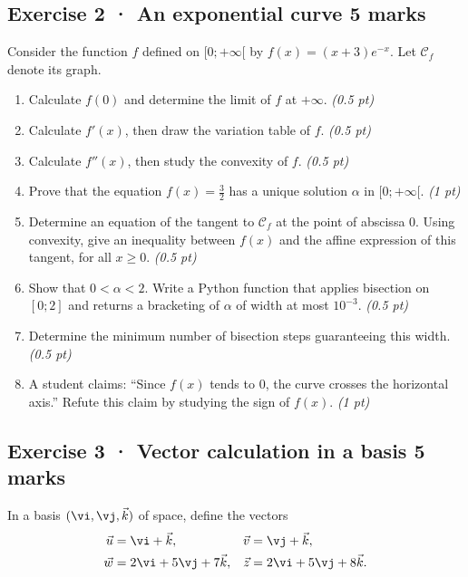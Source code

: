 \subsection*{Exercise 2 · An exponential curve \hfill 5 marks}Consider the function $f$ defined on $[0;+\infty[$ by $f(x)=(x+3)e^{-x}$. Let $\mathcal C_f$ denote its graph.

\begin{enumerate}

\item Calculate $f(0)$ and determine the limit of $f$ at $+\infty$. \hfill\textit{(0.5 pt)}

\item Calculate $f'(x)$, then draw the variation table of $f$. \hfill\textit{(0.5 pt)}

\item Calculate $f''(x)$, then study the convexity of $f$. \hfill\textit{(0.5 pt)}

\item Prove that the equation $f(x)=\frac{3}{2}$ has a unique solution $\alpha$ in $[0;+\infty[$. \hfill\textit{(1 pt)}

\item Determine an equation of the tangent to $\mathcal C_f$ at the point of abscissa $0$. Using convexity, give an inequality between $f(x)$ and the affine expression of this tangent, for all $x\ge0$. \hfill\textit{(0.5 pt)}

\item Show that $0<\alpha<2$. Write a Python function that applies bisection on $[0;2]$ and returns a bracketing of $\alpha$ of width at most $10^{-3}$. \hfill\textit{(0.5 pt)}

\item Determine the minimum number of bisection steps guaranteeing this width. \hfill\textit{(0.5 pt)}

\clearpage\item A student claims: ``Since $f(x)$ tends to $0$, the curve crosses the horizontal axis.'' Refute this claim by studying the sign of $f(x)$. \hfill\textit{(1 pt)}

\end{enumerate}

\clearpage{}\par

\subsection*{Exercise 3 · Vector calculation in a basis \hfill 5 marks}In a basis $(\vi,\vj,\vec k)$ of space, define the vectors
\[\begin{aligned}\vec u&=\vi+\vec k,&\vec v&=\vj+\vec k,\\
\vec w&=2\vi+5\vj+7\vec k,&\vec z&=2\vi+5\vj+8\vec k.\end{aligned}\]

